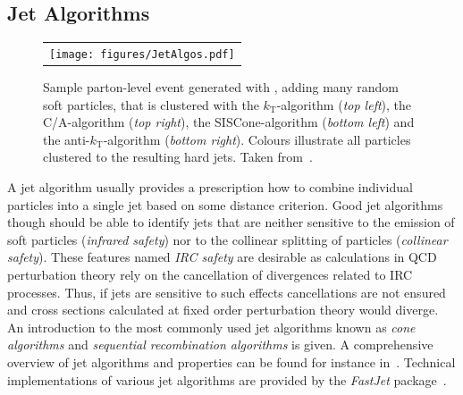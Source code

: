 \subsection{Jet Algorithms}
\label{subsec:jets_algos}
\begin{figure}[!tp]
  \centering 
  \begin{tabular}{c}
    \texttt{[image: figures/JetAlgos.pdf]} 
  \end{tabular}
  \caption{Sample parton-level event generated with \herwig, adding many random soft particles, that is clustered with the $k_\mathrm{T}$-algorithm (\textit{top left}), the C/A-algorithm (\textit{top right}), the SISCone-algorithm (\textit{bottom left}) and the anti-$k_\mathrm{T}$-algorithm (\textit{bottom right}). Colours illustrate all particles clustered to the resulting hard jets. Taken from~\cite{Salam:2009jx}.}
  \label{fig:jet_algos}
\end{figure}
A jet algorithm usually provides a prescription how to combine individual particles into a single jet based on some distance criterion. Good jet algorithms though should be able to identify jets that are neither sensitive to the emission of soft particles (\textit{infrared safety}) nor to the collinear splitting of particles (\textit{collinear safety}). These features named \textit{IRC safety} are desirable as calculations in QCD perturbation theory rely on the cancellation of divergences related to IRC processes. Thus, if jets are sensitive to such effects cancellations are not ensured and cross sections calculated at fixed order perturbation theory would diverge. \\
An introduction to the most commonly used jet algorithms known as \textit{cone algorithms} and \textit{sequential recombination algorithms} is given. A comprehensive overview of jet algorithms and properties can be found for instance in~\cite{Salam:2009jx}. Technical implementations of various jet algorithms are provided by the \textit{FastJet} package~\cite{Cacciari:2011ma, Cacciari:2005hq}.

